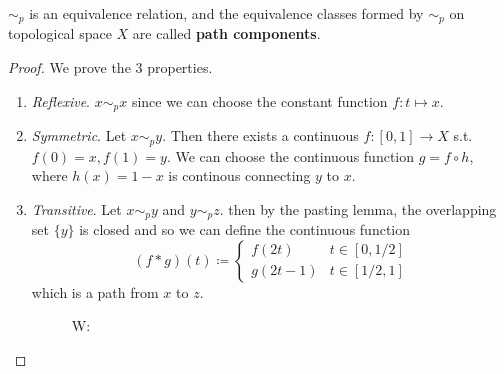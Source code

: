   \begin{lemma}
    $\sim_p$ is an equivalence relation, and the equivalence classes formed by $\sim_p$ on topological space $X$ are called \textbf{path components}.  
  \end{lemma}
  \begin{proof}
    We prove the 3 properties. 
    \begin{enumerate}
      \item \textit{Reflexive}. $x \sim_p x$ since we can choose the constant function $f: t \mapsto x$.  
      \item \textit{Symmetric}. Let $x \sim_p y$. Then there exists a continuous $f: [0, 1] \rightarrow X$ s.t. $f(0) = x, f(1) = y$. We can choose the continuous function $g = f \circ h$, where $h(x) = 1 - x$ is continous connecting $y$ to $x$. 
      \item \textit{Transitive}. Let $x \sim_p y$ and $y \sim_p z$. then by the pasting lemma, the overlapping set $\{y\}$ is closed and so we can define the continuous function 
      \begin{equation}
        (f \ast g)(t) \coloneqq \begin{cases} 
          f(2t) & t \in [0, 1/2] \\
          g(2t - 1) & t \in [1/2, 1] 
        \end{cases} 
      \end{equation}
      which is a path from $x$ to $z$. 

      \begin{figure}[H]
        \centering 
        \caption{W:}
      \end{figure}
    \end{enumerate}
  \end{proof}

